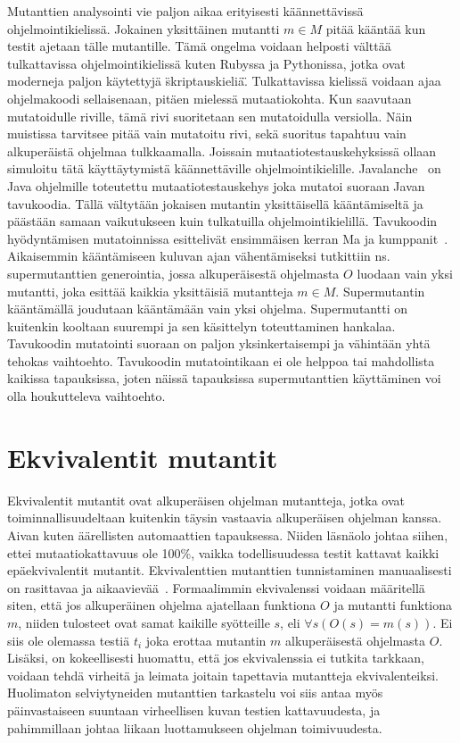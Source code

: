 \documentclass{tktltiki}
\begin{document}
Mutanttien analysointi vie paljon aikaa erityisesti käännettävissä ohjelmointikielissä. Jokainen yksittäinen mutantti $m\in M$ pitää kääntää kun testit ajetaan tälle mutantille. Tämä ongelma voidaan helposti välttää tulkattavissa ohjelmointikielissä kuten Rubyssa ja Pythonissa, jotka ovat moderneja paljon käytettyjä \"skriptauskieliä\". Tulkattavissa kielissä voidaan ajaa ohjelmakoodi sellaisenaan, pitäen mielessä mutaatiokohta. Kun saavutaan mutatoidulle riville, tämä rivi suoritetaan sen mutatoidulla versiolla. Näin muistissa tarvitsee pitää vain mutatoitu rivi, sekä suoritus tapahtuu vain alkuperäistä ohjelmaa tulkkaamalla. Joissain mutaatiotestauskehyksissä ollaan simuloitu tätä käyttäytymistä käännettäville ohjelmointikielille. Javalanche~\cite{SchulerZ09} on Java ohjelmille toteutettu mutaatiotestauskehys joka mutatoi suoraan Javan tavukoodia. Tällä vältytään jokaisen mutantin yksittäisellä kääntämiseltä ja päästään samaan vaikutukseen kuin tulkatuilla ohjelmointikielillä. Tavukoodin hyödyntämisen mutatoinnissa esittelivät ensimmäisen kerran Ma ja kumppanit~\cite{MaOK05}. Aikaisemmin kääntämiseen kuluvan ajan vähentämiseksi tutkittiin ns. supermutanttien generointia, jossa alkuperäisestä ohjelmasta $O$ luodaan vain yksi mutantti, joka esittää kaikkia yksittäisiä mutantteja $m\in M$. Supermutantin kääntämällä joudutaan kääntämään vain yksi ohjelma. Supermutantti on kuitenkin kooltaan suurempi ja sen käsittelyn toteuttaminen hankalaa. Tavukoodin mutatointi suoraan on paljon yksinkertaisempi ja vähintään yhtä tehokas vaihtoehto. Tavukoodin mutatointikaan ei ole helppoa tai mahdollista kaikissa tapauksissa, joten näissä tapauksissa supermutanttien käyttäminen voi olla houkutteleva vaihtoehto.

\section{Ekvivalentit mutantit}
Ekvivalentit mutantit ovat alkuperäisen ohjelman mutantteja, jotka ovat toiminnallisuudeltaan kuitenkin täysin vastaavia alkuperäisen ohjelman kanssa. Aivan kuten äärellisten automaattien tapauksessa. Niiden läsnäolo johtaa siihen, ettei mutaatiokattavuus ole 100\%, vaikka todellisuudessa testit kattavat kaikki epäekvivalentit mutantit. Ekvivalenttien mutanttien tunnistaminen manuaalisesti on rasittavaa ja aikaavievää~\cite{GrunSZ09}. Formaalimmin ekvivalenssi voidaan määritellä siten, että jos alkuperäinen ohjelma ajatellaan funktiona $O$ ja mutantti funktiona $m$, niiden tulosteet ovat samat kaikille syötteille $s$, eli $\forall s(O(s) = m(s))$. Ei siis ole olemassa testiä $t_i$ joka erottaa mutantin $m$ alkuperäisestä ohjelmasta $O$. Lisäksi, on kokeellisesti huomattu, että jos ekvivalenssia ei tutkita tarkkaan, voidaan tehdä virheitä ja leimata joitain tapettavia mutantteja ekvivalenteiksi. Huolimaton selviytyneiden mutanttien tarkastelu voi siis antaa myös päinvastaiseen suuntaan virheellisen kuvan testien kattavuudesta, ja pahimmillaan johtaa liikaan luottamukseen ohjelman toimivuudesta.
\end{document}
